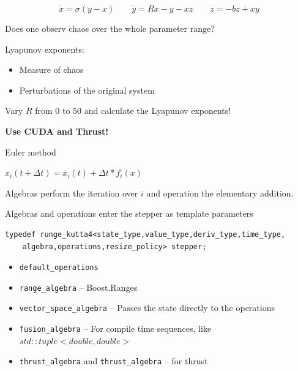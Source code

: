 \begin{frame}[fragile]
 


 $$
  \dot{x} = \sigma ( y - x ) \quad \quad \dot{y} = R x - y - x z \quad \quad \dot{z} = -b z + x y
 $$


Does one observ chaos over the whole parameter range?

\vspace{2ex}

Lyapunov exponents:
\begin{itemize}
 \item Measure of chaos
 \item Perturbations of the original system
\end{itemize}

\vspace{2ex}
Vary $R$ from $0$ to $50$ and calculate the Lyapunov exponents!

\vspace{2ex}
\centerline{\bf Use CUDA and Thrust!}

\end{frame}


\begin{frame}[fragile]


 \vspace{2ex}

Euler method

$ x_i(t+\Delta t) = x_i(t) + \Delta t * f_i(x)$

Algebras perform the iteration over $i$ and operation the elementary addition.

Algebras and operations enter the stepper as template parameters

\begin{lstlisting}
typedef runge_kutta4<state_type,value_type,deriv_type,time_type,
    algebra,operations,resize_policy> stepper; 
\end{lstlisting}

\begin{itemize}
 \item {\tt default\_operations}
 \item {\tt range\_algebra} -- Boost.Ranges
 \item {\tt vector\_space\_algebra} -- Passes the state directly to the operations
 \item {\tt fusion\_algebra} -- For compile time sequences, like $std::tuple< double , double >$
 \item {\tt thrust\_algebra} and {\tt thrust\_algebra} -- for thrust
\end{itemize}

\end{frame}


